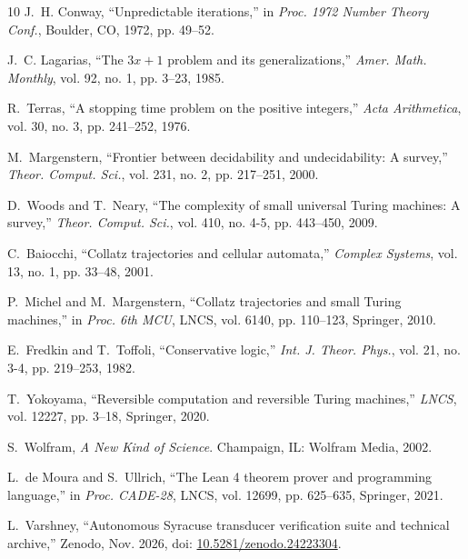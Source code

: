 \documentclass[journal,10pt,twocolumn]{IEEEtran}
\begin{document}
\begin{thebibliography}{10}
J.~H. Conway, ``Unpredictable iterations,'' in \emph{Proc. 1972 Number Theory Conf.}, Boulder, CO, 1972, pp. 49--52.

J.~C. Lagarias, ``The $3x + 1$ problem and its generalizations,'' \emph{Amer. Math. Monthly}, vol. 92, no. 1, pp. 3--23, 1985.

R.~Terras, ``A stopping time problem on the positive integers,'' \emph{Acta Arithmetica}, vol. 30, no. 3, pp. 241--252, 1976.

M.~Margenstern, ``Frontier between decidability and undecidability: A survey,'' \emph{Theor. Comput. Sci.}, vol. 231, no. 2, pp. 217--251, 2000.

D.~Woods and T.~Neary, ``The complexity of small universal Turing machines: A survey,'' \emph{Theor. Comput. Sci.}, vol. 410, no. 4-5, pp. 443--450, 2009.

C.~Baiocchi, ``Collatz trajectories and cellular automata,'' \emph{Complex Systems}, vol. 13, no. 1, pp. 33--48, 2001.

P.~Michel and M.~Margenstern, ``Collatz trajectories and small Turing machines,'' in \emph{Proc. 6th MCU}, LNCS, vol. 6140, pp. 110--123, Springer, 2010.

E.~Fredkin and T.~Toffoli, ``Conservative logic,'' \emph{Int. J. Theor. Phys.}, vol. 21, no. 3-4, pp. 219--253, 1982.

T.~Yokoyama, ``Reversible computation and reversible Turing machines,'' \emph{LNCS}, vol. 12227, pp. 3--18, Springer, 2020.

S.~Wolfram, \emph{A New Kind of Science}. Champaign, IL: Wolfram Media, 2002.

L.~de Moura and S.~Ullrich, ``The Lean 4 theorem prover and programming language,'' in \emph{Proc. CADE-28}, LNCS, vol. 12699, pp. 625--635, Springer, 2021.

L.~Varshney, ``Autonomous Syracuse transducer verification suite and technical archive,'' Zenodo, Nov. 2026, doi: \href{https://doi.org/10.5281/zenodo.24223304}{10.5281/zenodo.24223304}.
\end{thebibliography}
\end{document}
